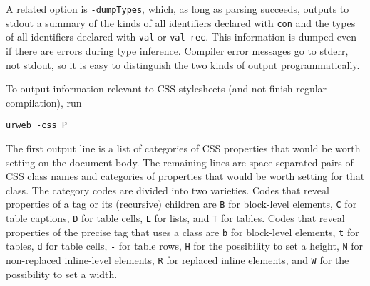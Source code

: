 \documentclass{article}
\newcommand{\cd}[1]{\texttt{#1}}
\begin{document}
A related option is \cd{-dumpTypes}, which, as long as parsing succeeds, outputs to stdout a summary of the kinds of all identifiers declared with \cd{con} and the types of all identifiers declared with \cd{val} or \cd{val rec}.  This information is dumped even if there are errors during type inference.  Compiler error messages go to stderr, not stdout, so it is easy to distinguish the two kinds of output programmatically.

To output information relevant to CSS stylesheets (and not finish regular compilation), run
\begin{verbatim}
urweb -css P
\end{verbatim}
The first output line is a list of categories of CSS properties that would be worth setting on the document body.  The remaining lines are space-separated pairs of CSS class names and categories of properties that would be worth setting for that class.  The category codes are divided into two varieties.  Codes that reveal properties of a tag or its (recursive) children are \cd{B} for block-level elements, \cd{C} for table captions, \cd{D} for table cells, \cd{L} for lists, and \cd{T} for tables.  Codes that reveal properties of the precise tag that uses a class are \cd{b} for block-level elements, \cd{t} for tables, \cd{d} for table cells, \cd{-} for table rows, \cd{H} for the possibility to set a height, \cd{N} for non-replaced inline-level elements, \cd{R} for replaced inline elements, and \cd{W} for the possibility to set a width.
\end{document}
